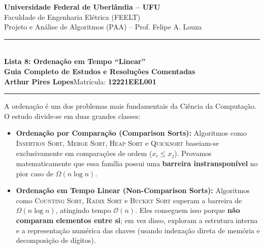 \documentclass[11pt,a4paper]{article}
\begin{document}
\begin{center}
    {\Large \textbf{Universidade Federal de Uberlândia -- UFU}}\\[2pt]
    {\large Faculdade de Engenharia Elétrica (FEELT)}\\[2pt]
    {\large Projeto e Análise de Algoritmos (PAA) -- Prof. Felipe A. Louza}\\[4pt]
    \rule{\textwidth}{1pt}\\[5pt]
    {\LARGE \textbf{Lista 8: Ordenação em Tempo ``Linear''}}\\[3pt]
    {\large \textbf{Guia Completo de Estudos e Resoluções Comentadas}}\\[3pt]
    \textbf{Arthur Pires Lopes}\quad Matrícula: \textbf{12221EEL001}\\[2pt]
    \rule{\textwidth}{0.5pt}
\end{center}

\vspace{0.2cm}

\begin{teoria}
A ordenação é um dos problemas mais fundamentais da Ciência da Computação. O estudo divide-se em duas grandes classes:
\begin{itemize}
    \item \textbf{Ordenação por Comparação (Comparison Sorts):} Algoritmos como \textsc{Insertion Sort}, \textsc{Merge Sort}, \textsc{Heap Sort} e \textsc{Quicksort} baseiam-se exclusivamente em comparações de ordem ($x_i \le x_j$). Provamos matematicamente que essa família possui uma \textbf{barreira instransponível} no pior caso de $\Omega(n \log n)$.
    \item \textbf{Ordenação em Tempo Linear (Non-Comparison Sorts):} Algoritmos como \textsc{Counting Sort}, \textsc{Radix Sort} e \textsc{Bucket Sort} superam a barreira de $\Omega(n \log n)$, atingindo tempo $\mathcal{O}(n)$. Eles conseguem isso porque \textbf{não comparam elementos entre si}; em vez disso, exploram a estrutura interna e a representação numérica das chaves (usando indexação direta de memória e decomposição de dígitos).
\end{itemize}
\end{teoria}

\vspace{0.3cm}

\end{document}
